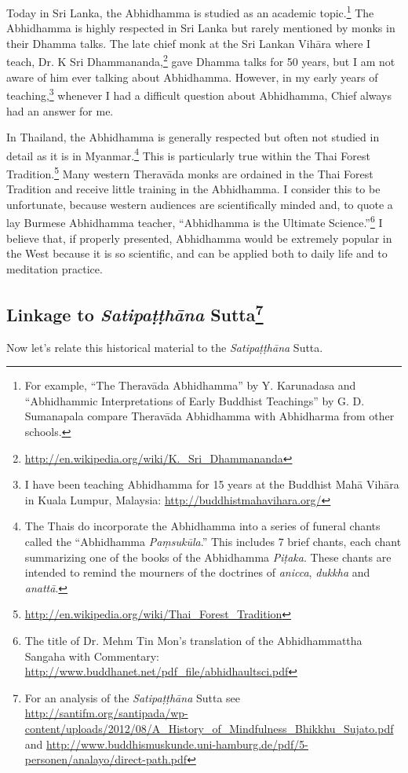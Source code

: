 Today in Sri Lanka, the Abhidhamma is studied as an academic topic.\footnote{For example, “The Theravāda Abhidhamma” by Y. Karunadasa and “Abhidhammic Interpretations of Early Buddhist Teachings” by G. D. Sumanapala compare Theravāda Abhidhamma with Abhidharma from other schools.} The Abhidhamma is highly respected in Sri Lanka but rarely mentioned by monks in their Dhamma talks. The late chief monk at the Sri Lankan Vihāra where I teach, Dr. K Sri Dhammananda,\footnote{\url{http://en.wikipedia.org/wiki/K._Sri_Dhammananda}} gave Dhamma talks for 50 years, but I am not aware of him ever talking about Abhidhamma. However, in my early years of teaching,\footnote{I have been teaching Abhidhamma for 15 years at the Buddhist Mahā Vihāra in Kuala Lumpur, Malaysia: \url{http://buddhistmahavihara.org/}} whenever I had a difficult question about Abhidhamma, Chief always had an answer for me.

\pagebreak

In Thailand, the Abhidhamma is generally respected but often not studied in detail as it is in Myanmar.\footnote{The Thais do incorporate the Abhidhamma into a series of funeral chants called the “Abhidhamma \textit{Paṃsukūla}.” This includes 7 brief chants, each chant summarizing one of the books of the Abhidhamma \textit{Piṭaka}. These chants are intended to remind the mourners of the doctrines of \textit{anicca}, \textit{dukkha} and \textit{anattā}.} This is particularly true within the Thai Forest Tradition.\footnote{\url{http://en.wikipedia.org/wiki/Thai_Forest_Tradition}} Many western Theravāda monks are ordained in the Thai Forest Tradition and receive little training in the Abhidhamma. I consider this to be unfortunate, because western audiences are scientifically minded and, to quote a lay Burmese Abhidhamma teacher, “Abhidhamma is the Ultimate Science.”\footnote{The title of Dr. Mehm Tin Mon’s translation of the Abhidhammattha Sangaha with Commentary: \url{http://www.buddhanet.net/pdf_file/abhidhaultsci.pdf}} I believe that, if properly presented, Abhidhamma would be extremely popular in the West because it is so scientific, and can be applied both to daily life and to meditation practice.

\subsection*{Linkage to \textit{Satipaṭṭhāna} Sutta\footnote{For an analysis of the \textit{Satipaṭṭhāna} Sutta see \url{http://santifm.org/santipada/wp-content/uploads/2012/08/A_History_of_Mindfulness_Bhikkhu_Sujato.pdf} and \url{http://www.buddhismuskunde.uni-hamburg.de/pdf/5-personen/analayo/direct-path.pdf} }}
Now let’s relate this historical material to the \textit{Satipaṭṭhāna} Sutta.

